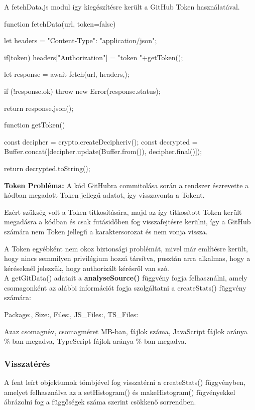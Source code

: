 A fetchData.js modul így kiegészítésre került a GitHub Token használatával.

\pagebreak

\begin{js}
function fetchData(url, token=false){
	let headers = {"Content-Type": "application/json"};
	
	if(token){
		headers["Authorization"] = "token "+getToken();
	}
	
	let response = await fetch(url, {headers,});
	
	if (!response.ok) {
		throw new Error(response.status);
	}
	
	return response.json();
}

function getToken(){
	const decipher = crypto.createDecipheriv();
	const decrypted = Buffer.concat([decipher.update(Buffer.from()),
						decipher.final()]);
	
	return decrypted.toString();
}
\end{js}
\textbf{Token Probléma:} A kód GitHubra commitolása során a rendszer észrevette a kódban megadott Token jellegű adatot, így visszavonta a Tokent. 

Ezért szükség volt a Token titkosítására, majd az így titkosított Token került megadásra a kódban és csak futásidőben fog visszafejtésre kerülni, így a GitHub számára nem Token jellegű a karaktersorozat és nem vonja vissza.

A Token egyébként nem okoz biztonsági problémát, mivel már említésre került, hogy nincs semmilyen privilégium hozzá társítva, pusztán arra alkalmas, hogy a kéréseknél jelezzük, hogy authorizált kérésről van szó.\\

A getGitData() adatait a \textbf{analyseSource()} függvény fogja felhasználni, amely csomagonként az alábbi információt fogja szolgáltatni a createStats() függvény számára:

\begin{js}
{Package:, Size:, Files:, JS_Files:, TS_Files:}
\end{js}
Azaz csomagnév, csomagméret MB-ban, fájlok száma, JavaScript fájlok aránya \%-ban megadva, TypeScript fájlok aránya \%-ban megadva.

\subsubsection{Visszatérés}

A fent leírt objektumok tömbjével fog visszatérni a createStats() függvényben, amelyet felhasználva az a setHistogram() és makeHistogram() fügvényekkel ábrázolni fog a függőségek száma szerint csökkenő sorrendben.

